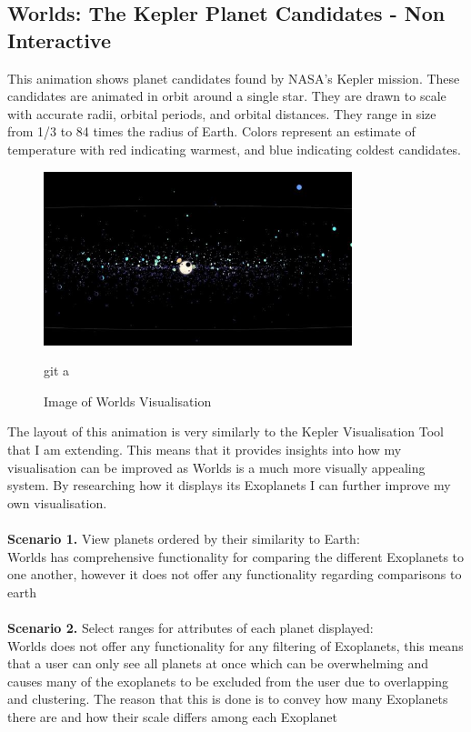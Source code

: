 \subsection{Worlds: The Kepler Planet Candidates - Non Interactive}
 This animation \cite{worlds} shows  planet candidates found by NASA's Kepler mission. These candidates are animated in orbit around a single star. They are drawn to scale with accurate radii, orbital periods, and orbital distances. They range in size from 1/3 to 84 times the radius of Earth. Colors represent an estimate of temperature with red indicating warmest, and blue indicating coldest candidates. 
\begin{figure}[h!]
  \centering
      \includegraphics[width=0.8\textwidth]{images/worlds.jpg}
  \caption{Image of Worlds Visualisation}git a
\end{figure}
The layout of this animation is very similarly to the Kepler Visualisation Tool that I am extending. This means that it provides insights into how my visualisation can be improved as Worlds is a much more visually appealing system. By researching how it displays its Exoplanets I can further improve my own visualisation.
 \\\\
{\bf Scenario 1.} View planets ordered by their similarity to Earth:\\
Worlds has comprehensive functionality for comparing the different Exoplanets to one another, however it does not offer any functionality regarding comparisons to earth 
\\\\
{\bf Scenario 2.} Select ranges for attributes of each planet displayed:\\
Worlds does not offer any functionality for any filtering of Exoplanets, this means that a user can only see all planets at once which can be overwhelming and causes many of the exoplanets to be excluded from the user due to overlapping and clustering. The reason that this is done is to convey how many Exoplanets there are and how their scale differs among each Exoplanet
